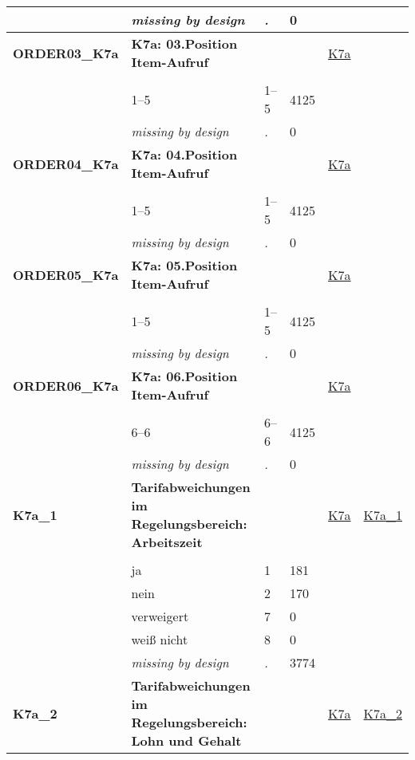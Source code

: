 \begin{longtable}{| L{2.45cm} | L{6cm} | C{1.5cm} | R{1cm} | C{2.25cm} | C{2.25cm} |}
   & \textit{missing by design} & \textit{.} & 0 &  &  \\ 
   \midrule
\textbf{ORDER03\_K7a}\label{var:ORDER03:K7a} & \textbf{K7a: 03.Position Item-Aufruf} &  &  & \hyperref[K7a]{K7a} & \hyperref[var:suf:]{} \\ 
   &  &  &  &  &  \\ 
   & 1--5 & 1--5 & 4125 &  &  \\ 
   & \textit{missing by design} & \textit{.} & 0 &  &  \\ 
   \midrule
\textbf{ORDER04\_K7a}\label{var:ORDER04:K7a} & \textbf{K7a: 04.Position Item-Aufruf} &  &  & \hyperref[K7a]{K7a} & \hyperref[var:suf:]{} \\ 
   &  &  &  &  &  \\ 
   & 1--5 & 1--5 & 4125 &  &  \\ 
   & \textit{missing by design} & \textit{.} & 0 &  &  \\ 
   \midrule
\textbf{ORDER05\_K7a}\label{var:ORDER05:K7a} & \textbf{K7a: 05.Position Item-Aufruf} &  &  & \hyperref[K7a]{K7a} & \hyperref[var:suf:]{} \\ 
   &  &  &  &  &  \\ 
   & 1--5 & 1--5 & 4125 &  &  \\ 
   & \textit{missing by design} & \textit{.} & 0 &  &  \\ 
   \midrule
\textbf{ORDER06\_K7a}\label{var:ORDER06:K7a} & \textbf{K7a: 06.Position Item-Aufruf} &  &  & \hyperref[K7a]{K7a} & \hyperref[var:suf:]{} \\ 
   &  &  &  &  &  \\ 
   & 6--6 & 6--6 & 4125 &  &  \\ 
   & \textit{missing by design} & \textit{.} & 0 &  &  \\ 
   \midrule
\textbf{K7a\_1}\label{var:K7a:1} & \textbf{Tarifabweichungen im Regelungsbereich: Arbeitszeit} &  &  & \hyperref[K7a]{K7a} & \hyperref[var:suf:K7a:1]{K7a\_1} \\ 
   &  &  &  &  &  \\ 
   & ja & 1 & 181 &  &  \\ 
   & nein & 2 & 170 &  &  \\ 
   & verweigert & 7 & 0 &  &  \\ 
   & weiß nicht & 8 & 0 &  &  \\ 
   & \textit{missing by design} & \textit{.} & 3774 &  &  \\ 
   \midrule
\textbf{K7a\_2}\label{var:K7a:2} & \textbf{Tarifabweichungen im Regelungsbereich: Lohn und Gehalt} &  &  & \hyperref[K7a]{K7a} & \hyperref[var:suf:K7a:2]{K7a\_2} \\ 

\end{longtable}
